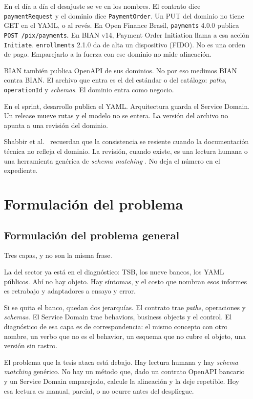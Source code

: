En el día a día el desajuste se ve en los nombres. El contrato dice \texttt{paymentRequest} y el dominio dice \texttt{PaymentOrder}. Un PUT del dominio no tiene GET en el YAML, o al revés. En Open Finance Brasil, \texttt{payments} 4.0.0 publica \texttt{POST /pix/payments}. En BIAN v14, Payment Order Initiation llama a esa acción \texttt{Initiate}. \texttt{enrollments} 2.1.0 da de alta un dispositivo (FIDO). No es una orden de pago. Emparejarlo a la fuerza con ese dominio no mide alineación.

BIAN también publica OpenAPI de sus dominios. No por eso medimos BIAN contra BIAN. El archivo que entra es el del estándar o del catálogo: \textit{paths}, \texttt{operationId} y \textit{schemas}. El dominio entra como negocio.

En el sprint, desarrollo publica el YAML. Arquitectura guarda el Service Domain. Un release mueve rutas y el modelo no se entera. La versión del archivo no apunta a una revisión del dominio.

Shabbir et al.\ \cite{Shabbir2025} recuerdan que la consistencia se resiente cuando la documentación técnica no refleja el dominio. La revisión, cuando existe, es una lectura humana o una herramienta genérica de \textit{schema matching} \cite{Shvaiko2005}. No deja el número en el expediente.

\section{Formulación del problema}

\subsection{Formulación del problema general}

Tres capas, y no son la misma frase.

La del sector ya está en el diagnóstico: TSB, los nueve bancos, los YAML públicos. Ahí no hay objeto. Hay síntomas, y el costo que nombran esos informes es retrabajo y adaptadores a ensayo y error.

Si se quita el banco, quedan dos jerarquías. El contrato trae \textit{paths}, operaciones y \textit{schemas}. El Service Domain trae behaviors, business objects y el control. El diagnóstico de esa capa es de correspondencia: el mismo concepto con otro nombre, un verbo que no es el behavior, un esquema que no cubre el objeto, una versión sin rastro.

El problema que la tesis ataca está debajo. Hay lectura humana y hay \textit{schema matching} genérico. No hay un método que, dado un contrato OpenAPI bancario y un Service Domain emparejado, calcule la alineación y la deje repetible. Hoy esa lectura es manual, parcial, o no ocurre antes del despliegue.

